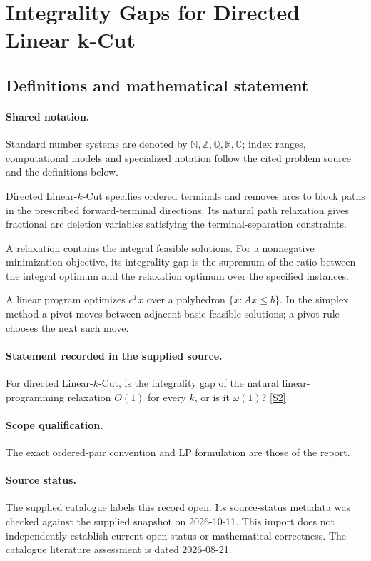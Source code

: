 \documentclass[11pt]{article}
\newcommand{\sref}[2]{\hyperlink{source:#1:#2}{[S#2]}}
\begin{document}
\section{Integrality Gaps for Directed Linear k-Cut}\label{statement}

\subsection{Definitions and mathematical statement}

\paragraph{Shared notation.}Standard number systems are denoted by $\mathbb N,\mathbb Z,\mathbb Q,\mathbb R,\mathbb C$; index ranges, computational models and specialized notation follow the cited problem source and the definitions below.


Directed Linear-$k$-Cut specifies ordered terminals and removes arcs to block paths in the prescribed forward-terminal directions. Its natural path relaxation gives fractional arc deletion variables satisfying the terminal-separation constraints.

A relaxation contains the integral feasible solutions. For a nonnegative minimization objective, its integrality gap is the supremum of the ratio between the integral optimum and the relaxation optimum over the specified instances.

A linear program optimizes $c^Tx$ over a polyhedron $\{x:Ax\leq b\}$. In the simplex method a pivot moves between adjacent basic feasible solutions; a pivot rule chooses the next such move.
\paragraph{Statement recorded in the supplied source.}
For directed Linear-$k$-Cut, is the integrality gap of the natural linear-programming relaxation $O(1)$ for every $k$, or is it $\omega(1)$? \sref{statement}{2}
\paragraph{Scope qualification.}
The exact ordered-pair convention and LP formulation are those of the report.
\paragraph{Source status.}
The supplied catalogue labels this record open. Its source-status metadata was checked against the supplied snapshot on 2026-10-11. This import does not independently establish current open status or mathematical correctness. The catalogue literature assessment is dated 2026-08-21.
\end{document}
